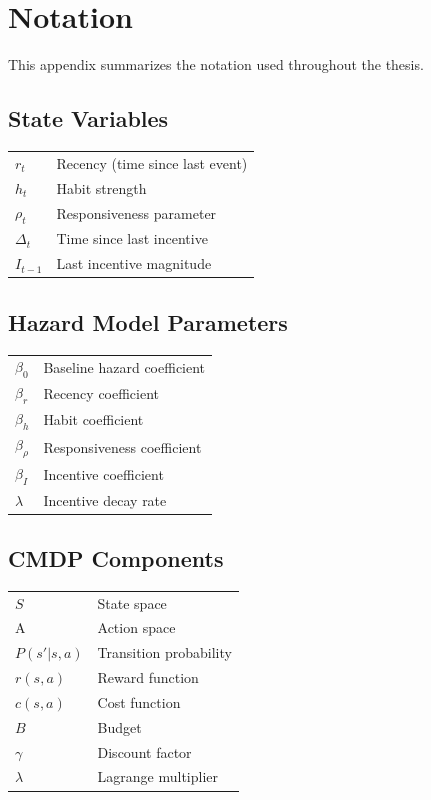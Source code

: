 \chapter{Notation}

This appendix summarizes the notation used throughout the thesis.

\section*{State Variables}
\begin{tabular}{ll}
$r_t$ & Recency (time since last event) \\
$h_t$ & Habit strength \\
$\rho_t$ & Responsiveness parameter \\
$\Delta_t$ & Time since last incentive \\
$I_{t-1}$ & Last incentive magnitude \\
\end{tabular}

\section*{Hazard Model Parameters}
\begin{tabular}{ll}
$\beta_0$ & Baseline hazard coefficient \\
$\beta_r$ & Recency coefficient \\
$\beta_h$ & Habit coefficient \\
$\beta_\rho$ & Responsiveness coefficient \\
$\beta_I$ & Incentive coefficient \\
$\lambda$ & Incentive decay rate \\
\end{tabular}

\section*{CMDP Components}
\begin{tabular}{ll}
$S$ & State space \\
A & Action space \\
$P(s'|s,a)$ & Transition probability \\
$r(s,a)$ & Reward function \\
$c(s,a)$ & Cost function \\
$B$ & Budget \\
$\gamma$ & Discount factor \\
$\lambda$ & Lagrange multiplier \\
\end{tabular}
